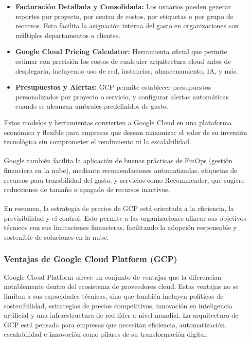 {\begin{itemize}
                    \item \textbf{Facturación Detallada y Consolidada:} Los usuarios pueden generar reportes por proyecto, por centro de costos, por etiquetas o por grupo de recursos. Esto facilita la asignación interna del gasto en organizaciones con múltiples departamentos o clientes.
                    \item \textbf{Google Cloud Pricing Calculator:} Herramienta oficial que permite estimar con precisión los costos de cualquier arquitectura cloud antes de desplegarla, incluyendo uso de red, instancias, almacenamiento, IA, y más.
                    \item \textbf{Presupuestos y Alertas:} GCP permite establecer presupuestos personalizados por proyecto o servicio, y configurar alertas automáticas cuando se alcanzan umbrales predefinidos de gasto.
                \end{itemize}
                
                Estos modelos y herramientas convierten a Google Cloud en una plataforma económica y flexible para empresas que desean maximizar el valor de su inversión tecnológica sin comprometer el rendimiento ni la escalabilidad.
                
                \paragraph{}Google también facilita la aplicación de buenas prácticas de FinOps (gestión financiera en la nube), mediante recomendaciones automatizadas, etiquetas de recursos para trazabilidad del gasto, y servicios como Recommender, que sugiere reducciones de tamaño o apagado de recursos inactivos.
                
                \paragraph{} En resumen, la estrategia de precios de GCP está orientada a la eficiencia, la previsibilidad y el control. Esto permite a las organizaciones alinear sus objetivos técnicos con sus limitaciones financieras, facilitando la adopción responsable y sostenible de soluciones en la nube.

            \subsubsection{Ventajas de Google Cloud Platform (GCP)}
                Google Cloud Platform ofrece un conjunto de ventajas que la diferencian notablemente dentro del ecosistema de proveedores cloud. Estas ventajas no se limitan a sus capacidades técnicas, sino que también incluyen políticas de sostenibilidad, estrategias de precios competitivos, innovación en inteligencia artificial y una infraestructura de red líder a nivel mundial. La arquitectura de GCP está pensada para empresas que necesitan eficiencia, automatización, escalabilidad e innovación como pilares de su transformación digital.
                
}
